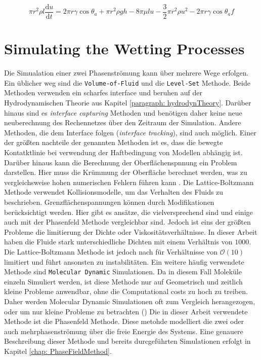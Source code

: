 \begin{equation}
    \pi r^2\rho l\frac{\mathrm{d}u}{\mathrm{d}t}=2\pi r\gamma\cos\theta_a+\pi r^2\rho gh-8\pi\mu lu-\frac{3}{2}\pi r^2\rho u^2-2\pi r\gamma\cos\theta_af
\end{equation}


\section{Simulating the Wetting Processes}
Die Simualation einer zwei Phasenströmung kann über mehrere Wege erfolgen. Ein üblicher weg sind die \texttt{Volume-of-Fluid} und die \texttt{Level-Set} Methode. Beide Methoden verwenden ein scharfes interface und beruhen auf der Hydrodynamischen Theorie aus Kapitel \ref{paragraph: hydrodynTheory}. Darüber hinaus sind es \textit{interface capturing} Methoden und benötigen daher keine neue neuberechnung des Rechennetzes über den Zeitraum der Simulation. Andere Methoden, die dem Interface folgen (\textit{interface tracking}), sind auch möglich. Einer der größten nachteile der genannten Methoden ist es, dass die bewegte Kontatktlinie bei verwendung der Haftbedingung von Modellen abhängig ist\cite{carlsonCapillarityDynamicWetting2012}. Darüber hinaus kann die Berechnung der Oberflächenspnnung ein Problem darstellen. Hier muss die Krümmung der Oberfläche berechnet werden, was zu vergleichsweise hohen numerischen Fehlern führen kann \cite{jamshidi2019SuitabilityPhasefieldAlgebraic,hagg2019DirekteNumerischeSimulation}. 
Die Lattice-Boltzmann Methode verwendet Kollisionsmodelle, um das Verhalten des Fluids zu beschrieben. Grenzflächenspannungen können durch Modifikationen berücksichtigt werden. Hier gibt es ansätze, die vielversprechend sind und einige auch mit der Phasenfeld Methode vergleichbar sind. Jedoch ist eins der größten Probleme die limitierung der Dichte oder Viskositätsverhältnisse. In dieser Arbeit haben die Fluide stark unterschiedliche Dichten mit einem Verhältnis von $1000$. Die Lattice-Boltzmann Methode ist jedoch nach \cite{chenCriticalReviewPseudopotential2014} für Verhältnisse von $\mathcal{O}(10)$ limitiert und führt ansonsten zu instabilitäten. 
Ein weitere häufig verwendete Methode sind \texttt{Molecular Dynamic} Simulationen. Da in diesem Fall Moleküle einzeln Simuliert werden, ist diese Methode nur auf Geometrisch und zeitlich kleine Probleme anwendbar, ohne die Computational costs zu hoch zu treiben. Daher werden {Molecular Dynamic} Simulationen oft zum Vergleich herangezogen, oder um nur kleine Probleme zu betrachten (\cite{datta2023EarlyStageLiquidInfiltration,lacisNanoscaleShearedDroplet2022,martic2002MolecularDynamicsSimulation,dimitrov2007CapillaryRiseNanopores})
Die in dieser Arbeit verwendete Methode ist die Phasenfeld Methode. Diese metohde modelliert die zwei oder auch mehrphasenströmung über die freie Energie des Systems. Eine genauere Beschreibung dieser Methode und bereits durcgeführten Simulationen erfolgt in Kapitel \ref{chap: PhaseFieldMethod}. 
